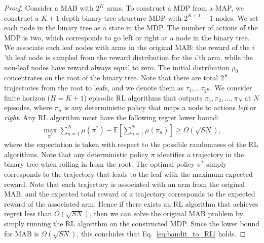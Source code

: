 \documentclass{article}
\begin{document}
\begin{proof}
Consider a MAB with $2^{K}$ arms. To construct a MDP from a MAP, we construct a $K+1$-depth binary-tree structure MDP with $2^{K+1}-1$ nodes. We set each node in the binary tree as a state in the MDP. The number of actions of the MDP is two, which corresponds to go left or right at a node in the binary tree. We associate each leaf nodes with arms in the original MAB: the reward of the $i$'th leaf node is sampled from the reward distribution for the $i$'th arm, while the non-leaf nodes have reward always equal to zero. The initial distribution $\rho_0$ concentrates on the root of the binary tree. Note that there are total $2^K$ trajectories from the root to leafs, and we denote them as $\tau_1,...\tau_{2^K}$. We consider finite horizon ($H=K+1$) episodic RL algorithms that outputs $\pi_1,\pi_2,...,\pi_N$ at $N$ episodes, where $\pi_n$ is any deterministic policy that maps a node to actions \emph{left} or \emph{right}. Any RL algorithm must have the following regret lower bound:
\begin{align}
\label{eq:bandit_to_RL}
\max_{\pi^*}\sum_{n=1}^N \mu(\pi^*) - \mathbb{E}[\sum_{n=1}^N \mu(\pi_n)] \geq \Omega(\sqrt{SN}),
\end{align} where the expectation is taken with respect to the possible randomness of the RL algorithms. Note that any deterministic policy $\pi$ identifies a trajectory in the binary tree when rolling in from the root. The optimal policy $\pi^*$ simply corresponds to the trajectory that leads to the leaf with the maximum expected reward. Note that each trajectory is associated with an arm from the original MAB, and the expected total reward of a trajectory corresponds to the expected reward of the associated arm. Hence if there exists an RL algorithm that achieves regret less than $O(\sqrt{SN})$, then we can solve the original MAB problem by simply running the RL algorithm on the constructed MDP. Since the lower bound for MAB is $\Omega(\sqrt{SN})$, this concludes that Eq.~\ref{eq:bandit_to_RL} holds. 
\end{proof}
\end{document}
